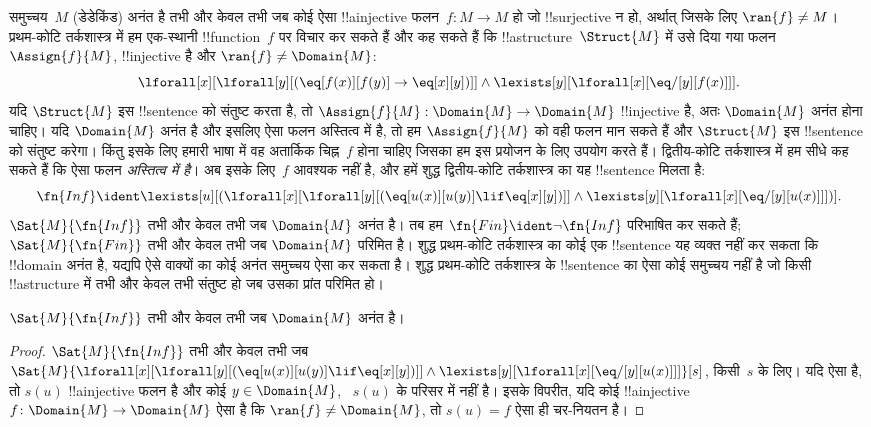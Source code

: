 \documentclass[../../../include/open-logic-section]{subfiles}
\begin{document}


समुच्चय~$M$ (डेडेकिंड) अनंत है तभी और केवल तभी जब कोई ऐसा !!a{injective}
फलन~$f\colon M \to M$ हो जो !!{surjective} न हो, अर्थात् जिसके लिए
$\ran{f} \neq M$। प्रथम-कोटि तर्कशास्त्र में हम एक-स्थानी
!!{function}~$f$ पर विचार कर सकते हैं और कह सकते हैं कि
!!a{structure}~$\Struct{M}$ में उसे दिया गया फलन~$\Assign{f}{M}$,
!!{injective} है और $\ran{f} \neq \Domain{M}$:
\[
\lforall[x][\lforall[y][(\eq[f(x)][f(y)] \to \eq[x][y])]] \land
\lexists[y][\lforall[x][\eq/[y][f(x)]]].
\]
यदि $\Struct{M}$ इस !!{sentence} को संतुष्ट करता है, तो
$\Assign{f}{M}: \Domain{M} \to \Domain{M}$ !!{injective} है, अतः
$\Domain{M}$ अनंत होना चाहिए। यदि $\Domain{M}$ अनंत है और इसलिए ऐसा फलन
अस्तित्व में है, तो हम $\Assign{f}{M}$ को वही फलन मान सकते हैं और
$\Struct{M}$ इस !!{sentence} को संतुष्ट करेगा। किंतु इसके लिए हमारी भाषा में
वह अतार्किक चिह्न~$f$ होना चाहिए जिसका हम इस प्रयोजन के लिए उपयोग करते हैं।
द्वितीय-कोटि तर्कशास्त्र में हम सीधे कह सकते हैं कि ऐसा फलन \emph{अस्तित्व
में है}। अब इसके लिए~$f$ आवश्यक नहीं है, और हमें शुद्ध द्वितीय-कोटि
तर्कशास्त्र का यह !!{sentence} मिलता है:
\[
\fn{Inf} \ident \lexists[u][(\lforall[x][\lforall[y][(\eq[u(x)][u(y)]
      \lif \eq[x][y])]] \land \lexists[y][\lforall[x][\eq/[y][u(x)]]])].
\]
$\Sat{M}{\fn{Inf}}$ तभी और केवल तभी जब $\Domain{M}$ अनंत है। तब हम
$\fn{Fin} \ident \lnot \fn{Inf}$ परिभाषित कर सकते हैं;
$\Sat{M}{\fn{Fin}}$ तभी और केवल तभी जब $\Domain{M}$ परिमित है। शुद्ध
प्रथम-कोटि तर्कशास्त्र का कोई एक !!{sentence} यह व्यक्त नहीं कर सकता कि
!!{domain} अनंत है, यद्यपि ऐसे वाक्यों का कोई अनंत समुच्चय ऐसा कर सकता है।
शुद्ध प्रथम-कोटि तर्कशास्त्र के !!{sentence} का ऐसा कोई समुच्चय नहीं है जो
किसी !!a{structure} में तभी और केवल तभी संतुष्ट हो जब उसका प्रांत परिमित हो।

\begin{prop}
$\Sat{M}{\fn{Inf}}$ तभी और केवल तभी जब $\Domain{M}$ अनंत है।
\end{prop}

\begin{proof}
$\Sat{M}{\fn{Inf}}$ तभी और केवल तभी जब
  $\Sat{M}{\lforall[x][\lforall[y][(\eq[u(x)][u(y)] \lif \eq[x][y])]]
    \land \lexists[y][\lforall[x][\eq/[y][u(x)]]]}[s]$, किसी~$s$ के लिए।
  यदि ऐसा है, तो $s(u)$ !!a{injective} फलन है और कोई $y \in \Domain{M}$,
  ~$s(u)$ के परिसर में नहीं है। इसके विपरीत, यदि कोई !!a{injective}
  $f\colon \Domain{M} \to \Domain{M}$ ऐसा है कि $\ran{f} \neq
  \Domain{M}$, तो $s(u) = f$ ऐसा ही चर-नियतन है।
\end{proof}
\end{document}
